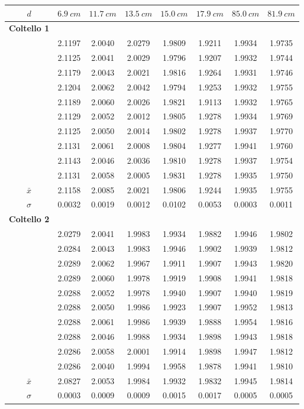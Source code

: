 \begin{center}
\begin{tabular}{*{8}{c}}
$d$& $6.9\ cm$ & $11.7\ cm$ & $13.5\ cm$  & $15.0\ cm$ & $17.9\ cm$ & $85.0\ cm$ & $81.9\ cm$ \\
\midrule
 \textbf{Coltello 1}&& & & & & \\
&2.1197 &2.0040&2.0279 &1.9809 & 1.9211 & 1.9934 & 1.9735\\
 &2.1125&2.0041 &2.0029&1.9796 & 1.9207 & 1.9932 & 1.9744 \\
 &2.1179&2.0043 &2.0021&1.9816 & 1.9264 & 1.9931 & 1.9746 \\
 &2.1204&2.0062 &2.0042&1.9794 & 1.9253 & 1.9932 & 1.9755 \\
 &2.1189&2.0060 &2.0026&1.9821 & 1.9113 & 1.9932 & 1.9765 \\
 &2.1129&2.0052&2.0012&1.9805 & 1.9278 & 1.9934 & 1.9769 \\
&2.1125 &2.0050&2.0014&1.9802 & 1.9278 & 1.9937 & 1.9770 \\
&2.1131 &2.0061&2.0008&1.9804 & 1.9277 & 1.9941 & 1.9760 \\
 &2.1143&2.0046&2.0036&1.9810 & 1.9278 & 1.9937 & 1.9754 \\
 &2.1131&2.0058&2.0005& 1.9831 & 1.9278 & 1.9935 & 1.9750 \\
 \midrule
$\bar{x}$& 2.1158 & 2.0085 & 2.0021 & 1.9806 & 1.9244 & 1.9935 & 1.9755\\
$\sigma$ & 0.0032 & 0.0019 & 0.0012 & 0.0102 & 0.0053 & 0.0003 & 0.0011\\
\midrule
\textbf{Coltello 2} && & & & & \\
&2.0279&2.0041&1.9983 &1.9934 & 1.9882 & 1.9946 & 1.9802 \\
&2.0284&2.0043&1.9983 &1.9946 & 1.9902 & 1.9939 & 1.9812 \\
&2.0289&2.0062&1.9967 &1.9911 & 1.9907 & 1.9943 & 1.9820 \\
&2.0289&2.0060&1.9978 &1.9919 & 1.9908 & 1.9941 & 1.9818 \\
&2.0288&2.0052&1.9978 &1.9940 & 1.9907 & 1.9940 & 1.9819 \\
&2.0288&2.0050&1.9986 &1.9923 & 1.9907 & 1.9952 & 1.9813 \\
&2.0288&2.0061&1.9986 &1.9939 & 1.9888 & 1.9954 & 1.9816 \\
&2.0288&2.0046&1.9988 &1.9934 & 1.9898 & 1.9943 & 1.9818 \\
&2.0286&2.0058&2.0001 &1.9914 & 1.9898 & 1.9947 & 1.9812  \\
&2.0286&2.0040&1.9994 &1.9958 & 1.9878 & 1.9941 & 1.9810 \\
 \midrule
$\bar{x}$& 2.0827 & 2.0053 & 1.9984 & 1.9932 & 1.9832 & 1.9945 & 1.9814\\
$\sigma$ & 0.0003 & 0.0009 & 0.0009 & 0.0015 & 0.0017 & 0.0005 & 0.0005\\
\bottomrule
\end{tabular}
\end{center}

